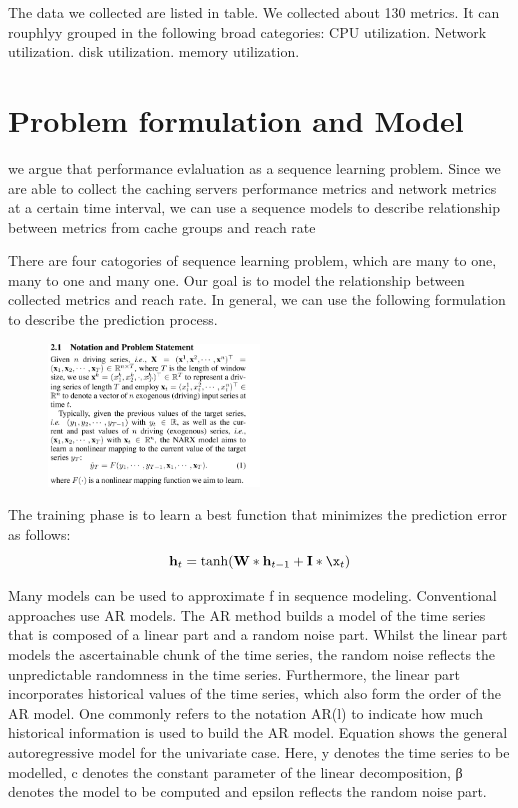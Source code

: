 \documentclass[5p]{elsarticle}
\newcommand{\dabiaolv}{reach rate}
\begin{document}
The data we collected are listed in table. We collected about 130 metrics. It can rouphlyy grouped in the following broad categories: CPU utilization. Network utilization. disk utilization. memory utilization.
\section{Problem formulation and Model}


we argue that performance evlaluation as a sequence learning problem. Since we are able to collect the caching servers performance metrics and network metrics at a certain time interval, we can use a sequence models to describe relationship between metrics from  cache groups and \dabiaolv

There are four catogories of sequence learning problem, which are many to one, many to one and many one. Our goal is to model the relationship between collected metrics and \dabiaolv. In general, we can use the following formulation to describe the prediction process.

\begin{figure}[h]
    \centering
    \includegraphics[width=0.5\textwidth]{notation_and_problem_statement.png}
    \caption{}
    \label{fig:notation_and_problem_statement}
\end{figure}

The training phase is to learn a best function that minimizes the prediction error as follows:
\begin{equation}
	\mathbf h_t = \tanh(\mathbf W * \mathbf h_{t-1} + \mathbf I * \x_t)
\end{equation}

Many models can be used to approximate f in sequence modeling. Conventional approaches use AR models. The AR method builds a model of the time series that is composed of a linear part and a random noise part. Whilst the linear part models the ascertainable chunk of the time series, the random noise reflects the unpredictable randomness in the time series. Furthermore, the linear part incorporates historical values of the time series, which also form the order of the AR model. One commonly refers to the notation AR(l) to indicate how much historical information is used to build the AR model. Equation shows the general autoregressive model for the univariate case. Here, y denotes the time series to be modelled, c denotes the constant parameter of the linear decomposition, β denotes the model to be computed and epsilon reflects the random noise part.
\end{document}
